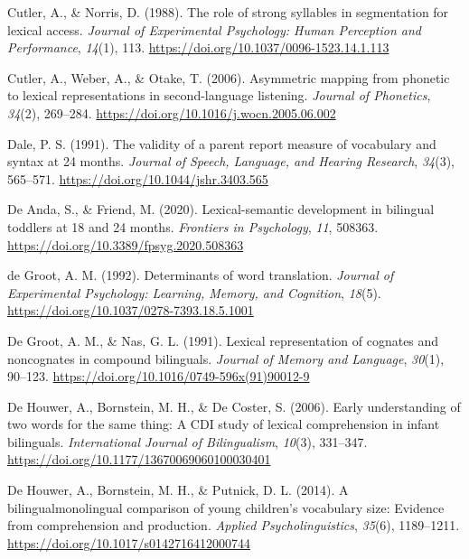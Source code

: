 \documentclass[
  12pt,
  b5paperpaper,
  twoside]{scrreprt}
\newlength{\cslhangindent}
\newlength{\cslentryspacingunit} %
\newenvironment{CSLReferences}[2] %
 {%
  \setlength{\parindent}{0pt}
  \ifodd #1
  \let\oldpar\par
  \def\par{\hangindent=\cslhangindent\oldpar}
  \fi
  \setlength{\parskip}{#2\cslentryspacingunit}
 }%
 {}
\begin{document}
\begin{CSLReferences}{1}{0}
\leavevmode{}%
Cutler, A., \& Norris, D. (1988). The role of strong syllables in
segmentation for lexical access. \emph{Journal of Experimental
Psychology: Human Perception and Performance}, \emph{14}(1), 113.
\url{https://doi.org/10.1037/0096-1523.14.1.113}

\leavevmode{}%
Cutler, A., Weber, A., \& Otake, T. (2006). Asymmetric mapping from
phonetic to lexical representations in second-language listening.
\emph{Journal of Phonetics}, \emph{34}(2), 269--284.
\url{https://doi.org/10.1016/j.wocn.2005.06.002}

\leavevmode{}%
Dale, P. S. (1991). The validity of a parent report measure of
vocabulary and syntax at 24 months. \emph{Journal of Speech, Language,
and Hearing Research}, \emph{34}(3), 565--571.
\url{https://doi.org/10.1044/jshr.3403.565}

\leavevmode{}%
De Anda, S., \& Friend, M. (2020). Lexical-semantic development in
bilingual toddlers at 18 and 24 months. \emph{Frontiers in Psychology},
\emph{11}, 508363. \url{https://doi.org/10.3389/fpsyg.2020.508363}

\leavevmode{}%
de Groot, A. M. (1992). Determinants of word translation. \emph{Journal
of Experimental Psychology: Learning, Memory, and Cognition},
\emph{18}(5). \url{https://doi.org/10.1037/0278-7393.18.5.1001}

\leavevmode{}%
De Groot, A. M., \& Nas, G. L. (1991). Lexical representation of
cognates and noncognates in compound bilinguals. \emph{Journal of Memory
and Language}, \emph{30}(1), 90--123.
\url{https://doi.org/10.1016/0749-596x(91)90012-9}

\leavevmode{}%
De Houwer, A., Bornstein, M. H., \& De Coster, S. (2006). Early
understanding of two words for the same thing: A {CDI} study of lexical
comprehension in infant bilinguals. \emph{International Journal of
Bilingualism}, \emph{10}(3), 331--347.
\url{https://doi.org/10.1177/13670069060100030401}

\leavevmode{}%
De Houwer, A., Bornstein, M. H., \& Putnick, D. L. (2014). A
bilingual{\textendash}monolingual comparison of young children's
vocabulary size: Evidence from comprehension and production.
\emph{Applied Psycholinguistics}, \emph{35}(6), 1189--1211.
\url{https://doi.org/10.1017/s0142716412000744}


\end{CSLReferences}
\end{document}
